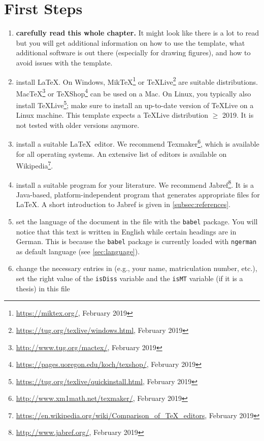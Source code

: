 \section{First Steps}
\begin{enumerate}
	\item \textbf{carefully read this whole chapter.} It might look like there is a lot to read but you will get additional information on how to use the template, what additional software is out there (especially for drawing figures), and how to avoid issues with the template.
	\item install \LaTeX. On Windows, Mik\TeX\footnote{\url{https://miktex.org/}, February 2019} or \TeX Live\footnote{\url{https://tug.org/texlive/windows.html}, February 2019} are suitable distributions. Mac\TeX\footnote{\url{http://www.tug.org/mactex/}, February 2019} or \TeX Shop\footnote{\url{https://pages.uoregon.edu/koch/texshop/}, February 2019} can be used on a Mac. On Linux, you typically also install \TeX Live\footnote{\url{https://tug.org/texlive/quickinstall.html}, February 2019}; make sure to install an up-to-date version of \TeX Live on a Linux machine. This template expects a \TeX Live distribution $\geq$ 2019. It is not tested with older versions anymore.
	\item install a suitable \LaTeX\ editor. We recommend Texmaker\footnote{\url{http://www.xm1math.net/texmaker/}, February 2019}, which is available for all operating systems. An extensive list of editors is available on Wikipedia\footnote{\url{https://en.wikipedia.org/wiki/Comparison_of_TeX_editors}, February 2019}.
	\item install a suitable program for your literature. We recommend Jabref\footnote{\url{http://www.jabref.org/}, February 2019}. It is a Java-based, platform-independent program that generates appropriate  files for \LaTeX. A short introduction to Jabref is given in \autoref{subsec:references}.
	\item set the language of the document in the  file with the \verb+babel+ package. You will notice that this text is written in English while certain headings are in German. This is because the \verb+babel+ package is currently loaded with \verb+ngerman+ as default language (see \autoref{sec:language}).
	\item change the necessary entries in  (e.g., your name, matriculation number, etc.), set the right value of the \verb+isDiss+ variable and the \verb+isMT+ variable (if it is a thesis) in this file

\end{enumerate}
